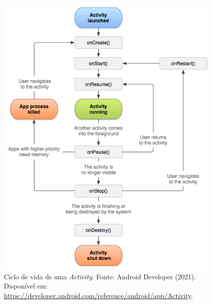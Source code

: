 \documentclass[12pt, a4paper]{article}
\newcommand{\tit}[1]{\textit{#1}}
\begin{document}
        \begin{figure}[!ht]
            \centering
            \includegraphics[width=\textwidth,height=0.5\textheight,keepaspectratio]{activity_lifecycle.png}
            \caption{Ciclo de vida de uma \tit{Activity}. Fonte: Android Developer (2021). Disponível em: \url{https://developer.android.com/reference/android/app/Activity}.}
            \label{fig:activy_lifecycle}
        \end{figure}
    
\end{document}
